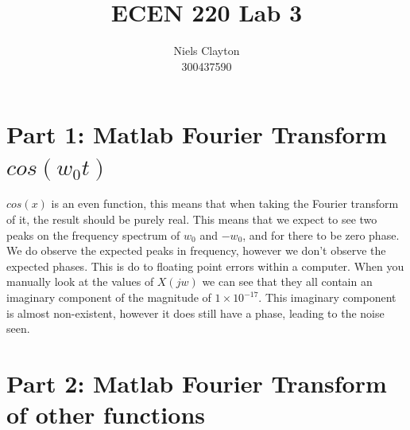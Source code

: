 \documentclass[a4paper,11pt]{article}
\begin{document}
\title{\LARGE{\textbf{ECEN 220 Lab 3}}}
\author{Niels Clayton \\300437590}
\date{}
\maketitle

\section*{Part 1: Matlab Fourier Transform $cos(w_0t)$}
\begin{center}
\end{center}

$cos(x)$ is an even function, this means that when taking the Fourier transform of it, the result should be purely real.  This means that we expect to see two peaks on the frequency spectrum of $w_0$ and $-w_0$, and for there to be zero phase. We do observe the expected peaks in frequency, however we don't observe the expected phases. This is do to floating point errors within a computer. When you manually look at the values of $X(jw)$ we can see that they all contain an imaginary component of the magnitude of $1\times 10^{-17}$. This imaginary component is almost non-existent, however it does still have a phase, leading to the noise seen.
\newpage

\section*{Part 2: Matlab Fourier Transform of other functions}
\end{document}
